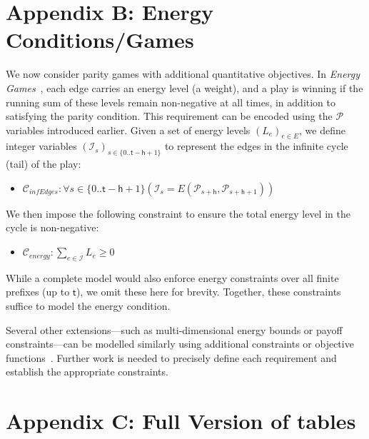 \documentclass[letterpaper]{article} %
\begin{document}

\section*{Appendix B: Energy Conditions/Games}

We now consider parity games with additional quantitative objectives. In \textit{Energy Games}~\cite{Chatterjee:2010}, each edge carries an energy level (a weight), and a play is winning if the running sum of these levels remain non-negative at all times, in addition to satisfying the parity condition.
%
This requirement can be encoded using the $\mathcal{P}$ variables introduced earlier. Given a set of energy levels $(L_e)_{e \in E}$, we define integer variables $(\mathcal{I}_s)_{s \in \{0..\mathsf{t} - \mathsf{h} + 1\}}$ to represent the edges in the infinite cycle (tail) of the play:

\begin{itemize}
    \item $\mathcal{C}_{\textit{infEdges}} : \forall s \in \{0..\mathsf{t} - \mathsf{h} + 1\} (\mathcal{I}_s = E(\mathcal{P}_{s+\mathsf{h}}, \mathcal{P}_{s+\mathsf{h}+1}))$
\end{itemize}

We then impose the following constraint to ensure the total energy level in the cycle is non-negative:

\begin{itemize}
    \item $\mathcal{C}_{\textit{energy}} : \sum_{e \in \mathcal{I}} L_e \geq 0$
\end{itemize}

While a complete model would also enforce energy constraints over all finite prefixes (up to $\mathsf{t}$), we omit these here for brevity. Together, these constraints suffice to model the energy condition.

Several other extensions—such as multi-dimensional energy bounds or payoff constraints—can be modelled similarly using additional constraints or objective functions~\cite{bozzelly:2020,Fijalkow:2014,Mogavero:2015,Weinert:2016}. Further work is needed to precisely define each requirement and establish the appropriate constraints.


\section*{Appendix C: Full Version of tables}
\end{document}
